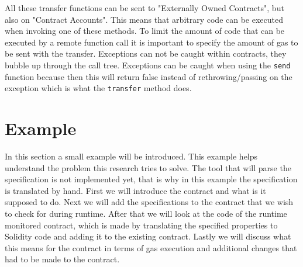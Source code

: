 \documentclass[a4paper]{article}
\begin{document}
All these transfer functions can be sent to "Externally Owned Contracts", but also on "Contract Accounts". This means that arbitrary code can be executed when invoking one of these methods. To limit the amount of code that can be executed by a remote function call it is important to specify the amount of gas to be sent with the transfer. Exceptions can not be caught within contracts, they bubble up through the call tree. Exceptions can be caught when using the \texttt{send} function because then this will return false instead of rethrowing/passing on the exception which is what the \texttt{transfer} method does.

\section{Example}
\label{sec:example}
In this section a small example will be introduced. This example helps understand the problem this research tries to solve. The tool that will parse the specification is not implemented yet, that is why in this example the specification is translated by hand. First we will introduce the contract and what is it supposed to do. Next we will add the specifications to the contract that we wish to check for during runtime. After that we will look at the code of the runtime monitored contract, which is made by translating the specified properties to Solidity code and adding it to the existing contract. Lastly we will discuss what this means for the contract in terms of gas execution and additional changes that had to be made to the contract.
\end{document}
